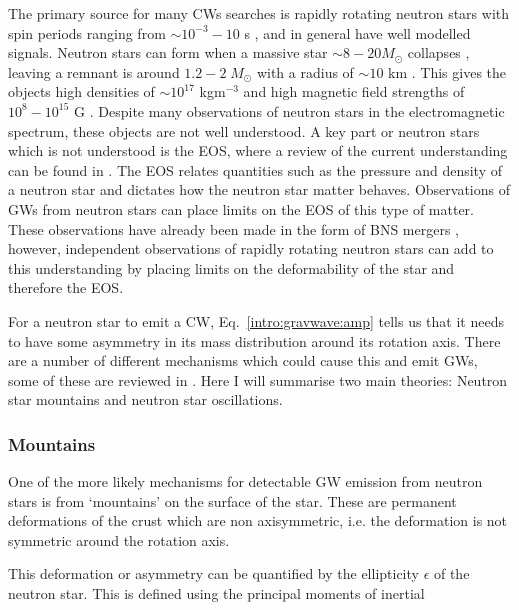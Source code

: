 The primary source for many \glspl{CW} searches is rapidly rotating neutron
stars with spin periods ranging from $\sim 10^{-3} - 10$ s
\citep{manchester2005AustraliaTelescope}, and in general have well modelled signals.  Neutron stars can form when a
massive star $\sim 8 - 20 M_{\odot}$ collapses \citep{fryer2005NeutronStar}, leaving a remnant is around $1.2-2 \;
M_{\odot}$ with a radius of $\sim 10$ km \citep{ozel2016MassesRadii}. 
This gives the objects high densities of $\sim 10^{17}$ kgm$^{-3}$ and high magnetic field strengths of $10^8 - 10^{15}$ G \citep{konar2017MagneticFields}.  
Despite many observations of neutron stars in the electromagnetic spectrum,
these objects are not well understood.  A key part or neutron stars which is
not understood is the \gls{EOS}, where a review of the current understanding can be
found in \cite{lattimer2016EquationState}.  The \gls{EOS} relates quantities
such as the pressure and density of a neutron star and dictates how the neutron
star matter behaves. Observations of \glspl{GW} from neutron stars can place
limits on the \gls{EOS} of this type of matter.  These observations have
already been made in the form of \gls{BNS} mergers
\citep{abbott2017GW170817Observation}, however, independent observations of
rapidly rotating neutron stars can add to this understanding by placing limits
on the deformability of the star and therefore the \gls{EOS}.

For a neutron star to emit a \gls{CW}, Eq.~\ref{intro:gravwave:amp} tells us that it needs to have some asymmetry in its mass distribution around its rotation axis.  There are a number of different mechanisms which
could cause this and emit \glspl{GW}, some of these are reviewed in
\citep{glampedakis2017GravitationalWaves,riles2017RecentSearches,haskell2015DetectingGravitational,lasky2015GravitationalWaves}.
Here I will summarise two main theories: Neutron star mountains and neutron
star oscillations.

\subsubsection{\label{intro:source:cw:mountain}Mountains}

One of the more likely mechanisms for detectable \gls{GW} emission from neutron
stars is from `mountains' on the surface of the star.  These are permanent
deformations of the crust which are non axisymmetric, i.e. the deformation is
not symmetric around the rotation axis.

This deformation or asymmetry can be quantified by the ellipticity $\epsilon$ of the neutron star.
This is defined using the principal moments of inertial

